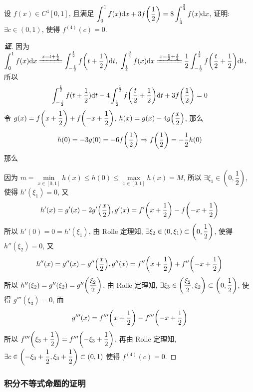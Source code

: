 \begin{example}
    设 $f(x)\in C^4[0,1]$, 且满足 $\displaystyle \int_{0}^{1}f(x)\dd x+3f\qty(\dfrac{1}{2})=8\int_{\frac{1}{4}}^{\frac{3}{4}}f(x)\dd x$, 证明: $\exists c\in(0,1)$, 使得 $f^{(4)}(c)=0.$
\end{example}
\begin{proof}[{\songti \textbf{证}}]
    因为 $\displaystyle\int_{0}^{1}f(x)\dd x\xlongequal{x=t+\frac{1}{2}}\int_{-\frac{1}{2}}^{\frac{1}{2}}f\qty(t+\dfrac{1}{2})\dd t,~\int_{\frac{1}{4}}^{\frac{3}{4}}f(x)\dd x\xlongequal{x=\frac{t}{2}+\frac{1}{2}}\dfrac{1}{2}\int_{-\frac{1}{2}}^{\frac{1}{2}}f\qty(\dfrac{t}{2}+\dfrac{1}{2})\dd t$, 所以
    $$\int_{-\frac{1}{2}}^{\frac{1}{2}}f(t+\dfrac{1}{2})\dd t-4\int_{\frac{1}{2}}^{\frac{1}{2}}f\qty(\dfrac{t}{2}+\dfrac{1}{2})\dd t +3f\qty(\dfrac{1}{2})=0$$
    令 $g(x)=f\qty(x+\dfrac{1}{2})+f\qty(-x+\dfrac{1}{2})$, $h(x)=g(x)-4g\qty(\dfrac{x}{2})$, 那么
    $$h(0)=-3g(0)=-6f\qty(\dfrac{1}{2})\Rightarrow f\qty(\dfrac{1}{2})=-\dfrac{1}{2}h(0)$$
    那么
    因为 $m=\min\limits_{x\in[0,1]}h(x)\leqslant h(0)\leqslant \max\limits_{x\in[0,1]}h(x)=M$, 所以 $\exists\xi_1\in(0,\dfrac{1}{2})$, 使得 $h'(\xi_1)=0$, 又
    $$h'(x)=g'(x)-2g'\qty(\dfrac{x}{2}),g'(x)=f'\qty(x+\dfrac{1}{2})-f\qty(-x+\dfrac{1}{2})$$
    所以 $h'(0)=0=h'(\xi_1)$, 由 Rolle 定理知, $\exists\xi_2\in(0,\xi_1)\subset \qty(0,\dfrac{1}{2})$, 使得 $h''(\xi_2)=0$, 又
    $$h''(x)=g''(x)-g''\qty(\dfrac{x}{2}),g''(x)=f''\qty(x+\dfrac{1}{2})+f''\qty(-x+\dfrac{1}{2})$$
    所以 $h''(\xi_2)=g''(\xi_2)=g''\qty(\dfrac{\xi_2}{2})$, 由 Rolle 定理知, $\exists\xi_3\in\qty(\dfrac{\xi_2}{2},\xi_2)\subset\qty(0,\dfrac{1}{2})$, 使得 $g'''(\xi_3)=0$, 而
    $$g'''(x)=f'''\qty(x+\dfrac{1}{2})-f'''\qty(-x+\dfrac{1}{2})$$
    所以 $f'''\qty(\xi_3+\dfrac{1}{2})=f'''\qty(-\xi_3+\dfrac{1}{2})$, 再由 Rolle 定理知, $\exists c\in\qty(-\xi_3+\dfrac{1}{2},\xi_3+\dfrac{1}{2})\subset(0,1)$ 使得 $f^{(4)}(c)=0.$
\end{proof}

\subsubsection{积分不等式命题的证明}

